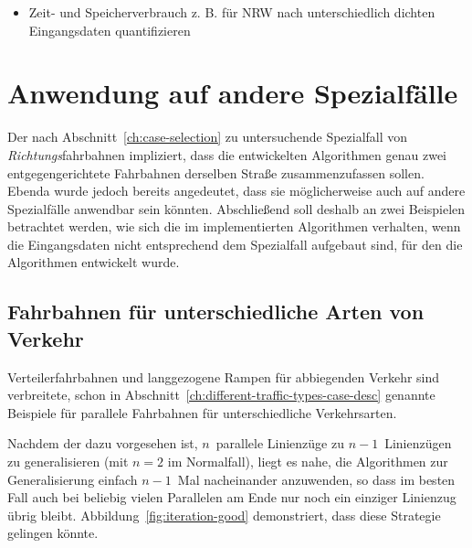 \documentclass[../main/thesis.tex]{subfiles}
\begin{document}
\bigskip\bigskip
\begin{itemize}
\item Zeit- und Speicherverbrauch z. B. für NRW nach unterschiedlich dichten Eingangsdaten quantifizieren
\end{itemize}
\biggap\biggap



\section{Anwendung auf andere Spezialfälle}
\label{ch:result-other-cases}

Der nach Abschnitt~\ref{ch:case-selection} zu untersuchende Spezialfall von \emph{Richtungs}fahrbahnen impliziert, dass die entwickelten Algorithmen genau zwei entgegengerichtete Fahrbahnen derselben Straße zusammenzufassen sollen.
Ebenda wurde jedoch bereits angedeutet, dass sie möglicherweise auch auf andere Spezialfälle anwendbar sein könnten.
Abschließend soll deshalb an zwei Beispielen betrachtet werden, wie sich die im  implementierten Algorithmen verhalten, wenn die Eingangsdaten nicht entsprechend dem Spezialfall aufgebaut sind, für den die Algorithmen entwickelt wurde.



\subsection{Fahrbahnen für unterschiedliche Arten von Verkehr}
\label{ch:iterated-execution}

Verteilerfahrbahnen und langgezogene Rampen für abbiegenden Verkehr sind verbreitete, schon in Abschnitt~\ref{ch:different-traffic-types-case-desc} genannte Beispiele für parallele Fahrbahnen für unterschiedliche Verkehrsarten.

Nachdem der  dazu vorgesehen ist, $n$~parallele Linienzüge zu $n-1$~Linienzügen zu generalisieren (mit $n=2$ im Normalfall), liegt es nahe, die Algorithmen zur Generalisierung einfach $n-1$~Mal nacheinander anzuwenden, so dass im besten Fall auch bei beliebig vielen Parallelen am Ende nur noch ein einziger Linienzug übrig bleibt.
Abbildung~\ref{fig:iteration-good} demonstriert, dass diese Strategie gelingen könnte.
\end{document}
